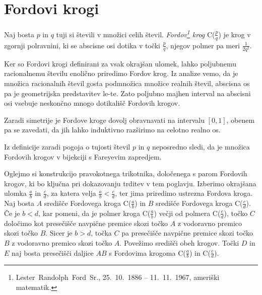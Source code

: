 \documentclass[mat1]{fmfdelo}
\begin{document}
%
\section{Fordovi krogi}

\begin{definicija}
Naj bosta $p$ in $q$ tuji si števili v množici celih števil.
\emph{Fordov\footnote{Lester~Randolph~Ford~Sr., 25.~10.~1886 -- 11.~11.~1967, ameriški matematik.} krog} C($\frac{p}{q}$) je krog v zgornji polravnini, ki se abscisne osi dotika v točki $\frac{p}{q}$, njegov polmer pa meri $\frac{1}{2q^2}$. 
\end{definicija}

Ker so Fordovi krogi definirani za vsak okrajšan ulomek, lahko poljubnemu racionalnemu številu enolično priredimo Fordov krog. Iz analize vemo, da je množica racionalnih števil gosta podmnožica množice realnih števil, abscisna os pa je geometrijska predstavitev le-te. Zato poljubno majhen interval na abscisni osi vsebuje neskončno mnogo dotikališč Fordovih krogov.

Zaradi simetrije je Fordove kroge dovolj obravnavati na intervalu $[0,1]$, obenem pa se zavedati, da jih lahko induktivno razširimo na celotno realno os.

\begin{opomba}
Iz definicije zaradi pogoja o tujosti števil $p$ in $q$ neposredno sledi, da je množica Fordovih krogov v bijekciji s Fareyevim zapredjem.
\end{opomba}

Oglejmo si konstrukcijo pravokotnega trikotnika, določenega s parom Fordovih krogov, ki bo ključna pri dokazovanju trditev v tem poglavju. Izberimo okrajšana ulomka $\frac{a}{b}$ in $\frac{c}{d}$, za katera velja $\frac{a}{b} < \frac{c}{d}$, ter jima priredimo ustrezna Fordova kroga. Naj bosta $A$ središče Fordovega kroga C($\frac{a}{b}$) in $B$ središče Fordovega kroga C($\frac{c}{d}$). Če je $b<d$, kar pomeni, da je polmer kroga C($\frac{a}{b}$) večji od polmera C($\frac{c}{d}$), točko $C$ določimo kot presečišče navpične premice skozi točko $A$ z vodoravno premico skozi točko $B$. Sicer je $b>d$, točka $C$ pa presečišče navpične premice skozi točko $B$ z vodoravno premico skozi točko $A$. Povežimo središči obeh krogov. Točki $D$ in $E$ naj bosta presečišči daljice $AB$ s Fordovima krogoma C($\frac{a}{b}$) in C($\frac{c}{d}$).
\end{document}
